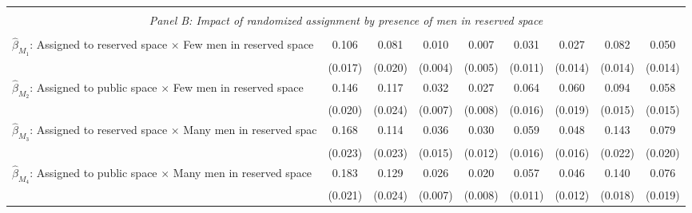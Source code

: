 \begin{tabular}{l*{8}{c}}
\hline \\[-1ex] \multicolumn{9}{c}{\textit{Panel B: Impact of randomized assignment by presence of men in reserved space}} \\\\[-1ex]
$\hat\beta_{M_1}$: Assigned to reserved space $\times$ Few men in reserved space&       0.106\sym{***}&       0.081\sym{***}&       0.010\sym{***}&       0.007         &       0.031\sym{***}&       0.027\sym{*}  &       0.082\sym{***}&       0.050\sym{***}\\
                    &     (0.017)         &     (0.020)         &     (0.004)         &     (0.005)         &     (0.011)         &     (0.014)         &     (0.014)         &     (0.014)         \\
[1em]
$\hat\beta_{M_2}$: Assigned to public space $\times$ Few men in reserved space&       0.146\sym{***}&       0.117\sym{***}&       0.032\sym{***}&       0.027\sym{***}&       0.064\sym{***}&       0.060\sym{***}&       0.094\sym{***}&       0.058\sym{***}\\
                    &     (0.020)         &     (0.024)         &     (0.007)         &     (0.008)         &     (0.016)         &     (0.019)         &     (0.015)         &     (0.015)         \\
[1em]
$\hat\beta_{M_3}$: Assigned to reserved space $\times$ Many men in reserved spac&       0.168\sym{***}&       0.114\sym{***}&       0.036\sym{**} &       0.030\sym{**} &       0.059\sym{***}&       0.048\sym{***}&       0.143\sym{***}&       0.079\sym{***}\\
                    &     (0.023)         &     (0.023)         &     (0.015)         &     (0.012)         &     (0.016)         &     (0.016)         &     (0.022)         &     (0.020)         \\
[1em]
$\hat\beta_{M_4}$: Assigned to public space $\times$ Many men in reserved space&       0.183\sym{***}&       0.129\sym{***}&       0.026\sym{***}&       0.020\sym{**} &       0.057\sym{***}&       0.046\sym{***}&       0.140\sym{***}&       0.076\sym{***}\\
                    &     (0.021)         &     (0.024)         &     (0.007)         &     (0.008)         &     (0.011)         &     (0.012)         &     (0.018)         &     (0.019)         \\

\end{tabular}

